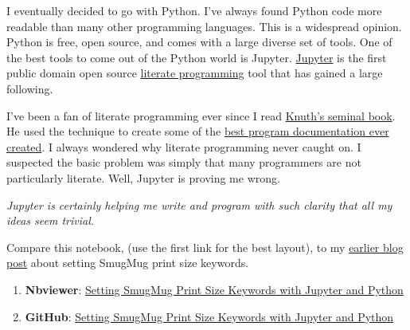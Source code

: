 I eventually decided to go with Python. I've always found Python code
more readable than many other programming languages. This is a
widespread opinion. Python is free, open source, and comes with a large
diverse set of tools. One of the best tools to come out of the Python
world is Jupyter. \href{https://jupyter.org/}{Jupyter} is the first
public domain open source
\href{https://en.wikipedia.org/wiki/Literate_programming}{literate
programming} tool that has gained a large following.

I've been a fan of literate programming ever since I read
\href{https://en.wikipedia.org/wiki/Literate_programming}{Knuth's
seminal book}. He used the technique to create some of the
\href{https://www.amazon.com/TeXbook-Donald-Knuth/dp/0201134489}{best
program documentation ever created}. I always wondered why literate
programming never caught on. I suspected the basic problem was simply
that many programmers are not particularly literate. Well, Jupyter is
proving me wrong.

\emph{Jupyter is certainly helping me write and program with such
clarity that all my ideas seem trivial.}

Compare this notebook, (use the first link for the best layout), to my
\href{https://analyzethedatanotthedrivel.org/2010/02/21/assigning-smugmug-print-size-keys/}{earlier
blog post} about setting SmugMug print size keywords.

\begin{enumerate}
\def\labelenumi{\arabic{enumi}.}
\item
  \textbf{Nbviewer}:
  \href{https://nbviewer.jupyter.org/github/bakerjd99/smugpyter/blob/master/notebooks/Setting\%20SmugMug\%20Print\%20Size\%20Keywords\%20with\%20Jupyter\%20and\%20Python.ipynb}{Setting
  SmugMug Print Size Keywords with Jupyter and Python}
\item
  \textbf{GitHub}:
  \href{https://github.com/bakerjd99/smugpyter/blob/master/notebooks/Setting\%20SmugMug\%20Print\%20Size\%20Keywords\%20with\%20Jupyter\%20and\%20Python.ipynb}{Setting
  SmugMug Print Size Keywords with Jupyter and Python}
\end{enumerate}


%



%

